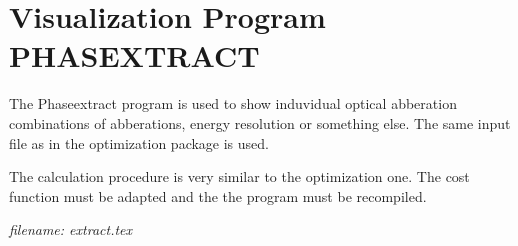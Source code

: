 

\chapter{Visualization Program PHASEXTRACT}   
The Phaseextract program is used to show induvidual optical abberation
combinations of abberations, energy resolution or something else. The same
input file as in the optimization package is used. 

The calculation procedure is very similar to the optimization one. The cost
function must be adapted and the the program must be recompiled.  


\tiny{\it filename: extract.tex}     

